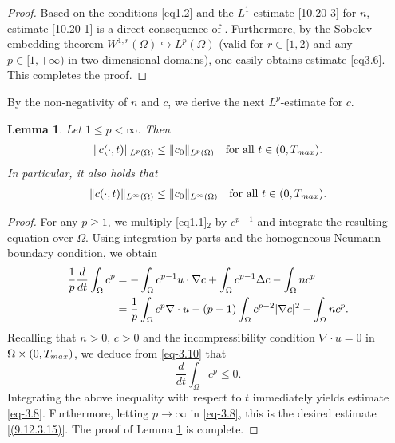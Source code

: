\documentclass[10pt,a4paper]{amsart}
\numberwithin{equation}{section}
\newtheorem{lemma}[theo]{Lemma}
\begin{document}
\begin{proof} 
Based on the conditions \eqref{eq1.2} and the $L^1$-estimate \eqref{10.20-3} for $n$, 
estimate \eqref{10.20-1} is a direct consequence of \cite[Lemma 2.5]{Wang-Xiang}. 
Furthermore, by the Sobolev embedding theorem 
$W^{1,r}(\Omega)\hookrightarrow L^p(\Omega)$ (valid for $r\in[1,2)$ and any 
$p\in[1,+\infty)$ in two dimensional domains), one easily obtains estimate \eqref{eq3.6}. 
This completes the proof.
\end{proof}

By the non-negativity of $n$ and $c$, we derive the next $L^p$-estimate for $c$.

\begin{lemma}\label{lem3.4}
Let $1 \leq p <\infty $. Then
\begin{align}\label{eq-3.8}
\|c(\cdot,t)\|_{L^p(\Omega)} \leq \|c_0\|_{L^p(\Omega)} \quad 
\text{for all } t \in (0, T_{\rm max}).
\end{align}
In particular, it also holds that
\begin{align}\label{(9.12.3.15)}
\|c(\cdot,t)\|_{L^\infty(\Omega)} \leq \|c_0\|_{L^\infty(\Omega)} \quad 
\text{for all } t \in (0, T_{\rm max}).
\end{align}
\end{lemma}

\begin{proof} 
For any \(p \geq 1\), we multiply \eqref{eq1.1}$_2$ by \(c^{p - 1}\) and integrate 
the resulting equation over \(\Omega\). Using integration by parts and the homogeneous 
Neumann boundary condition, we obtain
\begin{align}\label{eq-3.10}
\frac{1}{p} \frac{d}{dt} \int_{\Omega} c^p &= -\int_{\Omega} c^{p - 1} u \cdot \nabla c + \int_{\Omega} c^{p-1} \Delta c-\int_{\Omega} n c^p
\notag\\
&= \frac{1}{p} \int_{\Omega} c^p \nabla \cdot u - (p - 1) \int_{\Omega} c^{p - 2} |\nabla c|^2 - \int_{\Omega} n c^p.
\end{align}
Recalling that $n > 0$, $c > 0$ and the incompressibility condition $\nabla \cdot u = 0$ in $\Omega \times (0, T_{\rm max})$, we deduce from \eqref{eq-3.10} that
\[
 \frac{d}{dt} \int_{\Omega} c^p \leq 0.
\]
Integrating the above inequality with respect to \(t\) immediately yields estimate 
\eqref{eq-3.8}.
Furthermore, letting $ p \rightarrow \infty$ in \eqref{eq-3.8}, this is the 
desired estimate \eqref{(9.12.3.15)}. The proof of Lemma \ref{lem3.4} is
complete. 
\end{proof}
\end{document}

